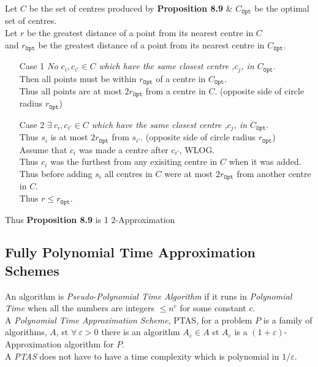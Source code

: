\documentclass[11pt,a4paper]{article}
\begin{document}
Let $C$ be the set of centres produced by \textbf{Proposition 8.9} \& $C_\mathtt{Opt}$ be the optimal set of centres.\\
Let $r$ be the greatest distance of a point from its nearest centre in $C$\\
and $r_\mathtt{Opt}$ be the greatest distance of a point from its nearest centre in $C_\mathtt{Opt}$.
\begin{itemize}
	\item[Case 1]\textit{No $c_i,c_{i'}\in C$ which have the same closest centre ,$c_j$, in $C_\mathtt{Opt}$}.\\
	Then all points must be within $r_\mathtt{Opt}$ of a centre in $C_\mathtt{Opt}$.\\
	Thus all points are at most $2r_\mathtt{Opt}$ from a centre in $C$. (opposite side of circle radius $r_\mathtt{Opt}$)\\
	\item[Case 2]\textit{$\exists\ c_i,c_{i'}\in C$ which have the same closest centre ,$c_j$, in $C_\mathtt{Opt}$}.\\
	Thus $s_i$ is at most $2r_\mathtt{Opt}$ from $s_{i'}$. (opposite side of circle radius $r_\mathtt{Opt}$)\\
	Assume that $c_i$ was made a centre after $c_{i'}$, WLOG.\\
	Thus $c_i$ was the furthest from any exisiting centre in $C$ when it was added.\\
	Thus before adding $s_i$ all centres in $C$ were at most $2r_\mathtt{Opt}$ from another centre in $C$.\\
	Thus $r\leq r_\mathtt{Opt}$.
\end{itemize}
Thus \textbf{Proposition 8.9} is 1 $2$-Approximation

\subsection{Fully Polynomial Time Approximation Schemes}

An algorithm is \textit{Pseudo-Polynomial Time Algorithm} if it runs in \textit{Polynomial Time} when all the numbers are integers $\leq n^c$ for some constant $c$.\\

A \textit{Polynomial Time Approximation Scheme}, PTAS, for a problem $P$ is a family of algorithms, $A$, st $\forall\ \varepsilon>0$ there is an algorithm $A_\varepsilon\in A$ st $A_\varepsilon$ is a $(1+\varepsilon)$-Approximation algorithm for $P$.\\
\nb A \textit{PTAS} does not have to have a time complexity which is polynomial in $1/\varepsilon$.\\
\end{document}
